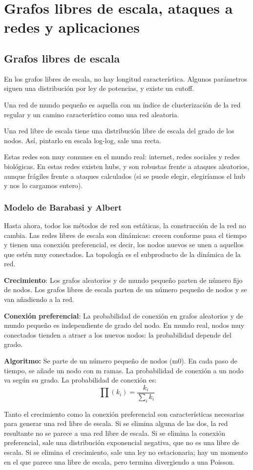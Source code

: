 \chapter{Grafos libres de escala, ataques a redes y aplicaciones}
\section{Grafos libres de escala}
En los grafos libres de escala, no hay longitud característica. Algunos parámetros siguen una distribución por ley de potencias, y existe un cutoff.

Una red de mundo pequeño es aquella con un índice de clusterización de la red regular y un camino característico como una red aleatoria. 

Una red libre de escala tiene una distribución libre de escala del grado de los nodos. Así, pintarlo en escala log-log, sale una recta.

Estas redes son muy comunes en el mundo real: internet, redes sociales y redes biológicas. En estas redes existen hubs, y son robustas frente a ataques aleatorios, aunque frágiles frente a ataques calculados (si se puede elegir, elegiríamos el hub y nos lo cargamos entero).

\subsection{Modelo de Barabasi y Albert} 
Hasta ahora, todos los métodos de red son estáticas, la construcción de la red no cambia. Las redes libres de escala son dinámicas: crecen conforme pasa el tiempo y tienen una conexión preferencial, es decir, los nodos nuevos se unen a aquellos que estén muy conectados. La topología es el subproducto de la dinámica de la red. 

\textbf{Crecimiento}: Los grafos aleatorios y de mundo pequeño parten de número fijo de nodos. Los grafos libres de escala parten de un número pequeño de nodos y se van añadiendo a la red.

\textbf{Conexión preferencial}: La probabilidad de conexión en grafos
aleatorios y de mundo pequeño
es independiente de grado del nodo. En mundo real, nodos muy conectados tienden a atraer a los nuevos nodos: la probabilidad depende del grado. 

\textbf{Algoritmo:}
Se parte de un número pequeño de nodos (m0). En cada paso de tiempo, se añade un nodo con m ramas. La probabilidad de conexión a un nodo va según su grado. La probabilidad de conexión es:
$$\prod(k_i) = \frac{k_i}{\sum_i k_i}$$

Tanto el crecimiento como la conexión preferencial son características necesarias para generar una red libre de escala. Si se elimina alguna de las dos, la red resultante no se parece a una red libre de escala. Si se elimina la conexión preferencial, sale una distribución exponencial negativa, que no es una libre de escala. Si se elimina el crecimiento, sale una ley no estacionaria; hay un momento en el que parece una libre de escala, pero termina divergiendo a una Poisson.